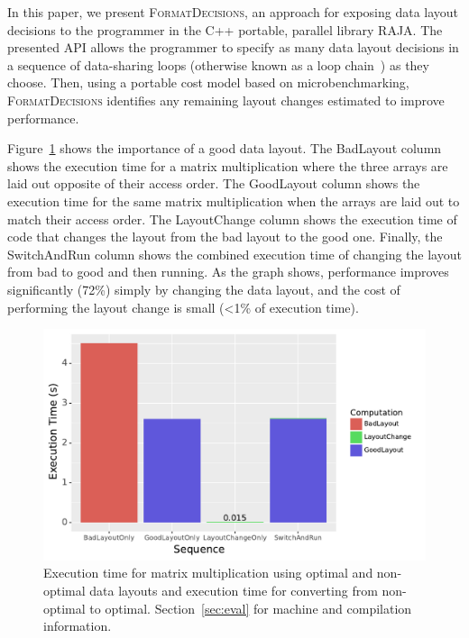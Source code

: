 \documentclass[sigconf,review=true]{acmart}
\newcommand{\FormatDecisions}[0]{{\textsc{FormatDecisions}}}
\begin{document}
In this paper, we present \FormatDecisions{}, an approach for exposing data layout decisions to the programmer in the C++ portable, parallel library RAJA.
The presented API allows the programmer to specify as many data layout decisions in a sequence of data-sharing loops (otherwise known as a loop chain~\cite{krieger2013loop}) as they choose.
Then, using a portable cost model based on microbenchmarking, \FormatDecisions{} identifies any remaining layout changes estimated to improve performance.  

Figure~\ref{IntroExample} shows the importance of a good data layout. 
The BadLayout column shows the execution time for a matrix multiplication where the three arrays are laid out opposite of their access order. 
The GoodLayout column shows the execution time for the same matrix multiplication when the arrays are laid out to match their access order.
The LayoutChange column shows the execution time of code that changes the layout from the bad layout to the good one.
Finally, the SwitchAndRun column shows the combined execution time of changing the layout from bad to good and then running.
As the graph shows, performance improves  significantly (72\%) simply by changing the data layout, and the cost of performing the layout change is small (<1\% of execution time). 


\begin{figure}
	\includegraphics[width=\columnwidth]{IntroExampleGraph.pdf}
	\caption{Execution time for matrix multiplication using optimal and non-optimal data layouts and execution time for converting from non-optimal to optimal. Section~\ref{sec:eval} for machine and compilation information.}
	\label{IntroExample}
\end{figure}
\end{document}
